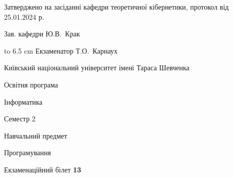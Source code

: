\documentclass[12pt, ukrainian]{article}
\begin{document}
{\smallskip\smallskip \begin {scriptsize} Затверджено на засіданні кафедри теоретичної кібернетики, протокол   від   25.01.2024 р.\par\smallskip\smallskip\smallskip\smallskip
{\parbox {6.5 cm} {Зав. кафедри \dotfill Ю.В.~Крак}}\hspace {0.7cm} {\hbox to 6.5 cm { Екзаменатор \dotfill Т.О.~Карнаух}} \end{scriptsize}}
\newpage
{{\begin {scriptsize}\par
{ \center  Київський національний університет імені Тараса Шевченка \par}
{\parbox {5 cm}{Освітня програма \hfill}{\parbox {7 cm}{Інформатика\hfill}}\parbox {6 cm}{\hfill Семестр 2}}\par
{\parbox {5 cm} {Навчальний предмет \hfill}\parbox {7 cm}{Програмування \hfill}\parbox {6cm}{\hfill}\par}\vspace{-15pt} \end{scriptsize}}{\center Екзаменаційний білет \No \textbf { 13 }\par}}
\end{document}
